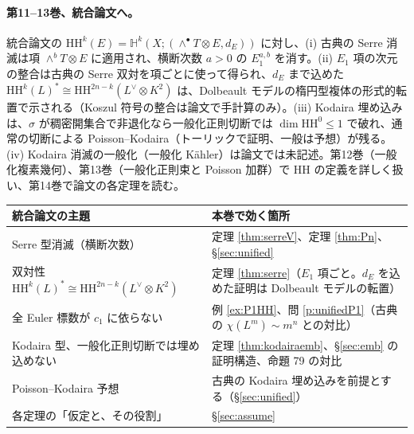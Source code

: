 \paragraph{第11--13巻、統合論文へ。}統合論文の $\mathrm{HH}^k(E)=\mathbb H^k(X;(\wedge^\bullet T\otimes E,d_E))$ に対し、(i) 古典の Serre 消滅は項 $\wedge^bT\otimes E$ に適用され、横断次数 $a>0$ の $E_1^{a,b}$ を消す。(ii) $E_1$ 項の次元の整合は古典の Serre 双対を項ごとに使って得られ、$d_E$ まで込めた $\mathrm{HH}^k(L)^*\cong\mathrm{HH}^{2n-k}(L^\vee\otimes K^2)$ は、Dolbeault モデルの楕円型複体の形式的転置で示される（Koszul 符号の整合は論文で手計算のみ）。(iii) Kodaira 埋め込みは、$\sigma$ が稠密開集合で非退化なら一般化正則切断では $\dim\mathrm{HH}^0\le1$ で破れ、通常の切断による Poisson--Kodaira（トーリックで証明、一般は予想）が残る。(iv) Kodaira 消滅の一般化（一般化 Kähler）は論文では未記述。第12巻（一般化複素幾何）、第13巻（一般化正則束と Poisson 加群）で $\mathrm{HH}$ の定義を詳しく扱い、第14巻で論文の各定理を読む。
\begin{center}
\small
\begin{tabular}{p{}p{}}
\toprule
統合論文の主題 & 本巻で効く箇所\\\midrule
Serre 型消滅（横断次数） & 定理 \ref{thm:serreV}、定理 \ref{thm:Pn}、\S\ref{sec:unified}\\
双対性 $\mathrm{HH}^k(L)^*\cong\mathrm{HH}^{2n-k}(L^\vee\otimes K^2)$ & 定理 \ref{thm:serre}（$E_1$ 項ごと。$d_E$ を込めた証明は Dolbeault モデルの転置）\\
全 Euler 標数が $c_1$ に依らない & 例 \ref{ex:P1HH}、問 \ref{p:unifiedP1}（古典の $\chi(L^m)\sim m^n$ との対比）\\
Kodaira 型、一般化正則切断では埋め込めない & 定理 \ref{thm:kodairaemb}、\S\ref{sec:emb} の証明構造、命題 79 の対比\\
Poisson--Kodaira 予想 & 古典の Kodaira 埋め込みを前提とする（\S\ref{sec:unified}）\\
各定理の「仮定と、その役割」 & \S\ref{sec:assume}\\\bottomrule
\end{tabular}
\end{center}

